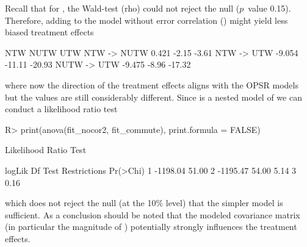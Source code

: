 \documentclass[%
    twoside, openright, titlepage, numbers=noenddot,%
    cleardoublepage=empty,%
    abstract=false,%
    BCOR=5.5mm, paper=a5, fontsize=10pt,%
]{scrreprt}
\begin{document}
Recall that for , the Wald-test (rho) could not reject the null ($p$~value 0.15). Therefore, adding  to the model without error correlation () might yield less biased treatment effects
%
\begin{Schunk}
\begin{Soutput}
               NTW   NUTW    UTW
NTW -> NUTW  0.421  -2.15  -3.61
NTW -> UTW  -9.054 -11.11 -20.93
NUTW -> UTW -9.475  -8.96 -17.32
\end{Soutput}
\end{Schunk}
%
where now the direction of the treatment effects aligns with the OPSR models but the values are still considerably different. Since  is a nested model of  we can conduct a likelihood ratio test
%
\begin{Schunk}
\begin{Sinput}
R> print(anova(fit_nocor2, fit_commute), print.formula = FALSE)
\end{Sinput}
\begin{Soutput}
Likelihood Ratio Test

    logLik       Df     Test Restrictions Pr(>Chi)
1 -1198.04    51.00                               
2 -1195.47    54.00     5.14            3     0.16
\end{Soutput}
\end{Schunk}
%
which does not reject the null (at the 10\% level) that the simpler model is sufficient. As a conclusion should be noted that the modeled covariance matrix (in particular the magnitude of ) potentially strongly influences the treatment effects.
\end{document}
